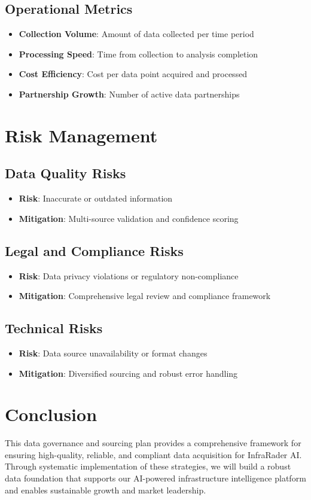 \documentclass[business]{../templates/infraradar-main}
\begin{document}
\subsection{Operational Metrics}
\begin{itemize}
    \item \textbf{Collection Volume}: Amount of data collected per time period
    \item \textbf{Processing Speed}: Time from collection to analysis completion
    \item \textbf{Cost Efficiency}: Cost per data point acquired and processed
    \item \textbf{Partnership Growth}: Number of active data partnerships
\end{itemize}

\section{Risk Management}

\subsection{Data Quality Risks}
\begin{itemize}
    \item \textbf{Risk}: Inaccurate or outdated information
    \item \textbf{Mitigation}: Multi-source validation and confidence scoring
\end{itemize}

\subsection{Legal and Compliance Risks}
\begin{itemize}
    \item \textbf{Risk}: Data privacy violations or regulatory non-compliance
    \item \textbf{Mitigation}: Comprehensive legal review and compliance framework
\end{itemize}

\subsection{Technical Risks}
\begin{itemize}
    \item \textbf{Risk}: Data source unavailability or format changes
    \item \textbf{Mitigation}: Diversified sourcing and robust error handling
\end{itemize}

\section{Conclusion}

This data governance and sourcing plan provides a comprehensive framework for ensuring high-quality, reliable, and compliant data acquisition for InfraRader AI. Through systematic implementation of these strategies, we will build a robust data foundation that supports our AI-powered infrastructure intelligence platform and enables sustainable growth and market leadership.
\end{document}
